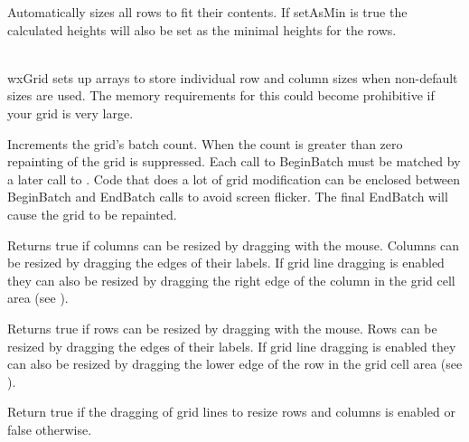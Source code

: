 Automatically sizes all rows to fit their contents. If setAsMin is true the calculated heights will
also be set as the minimal heights for the rows.

\\
wxGrid sets up arrays to store individual row and column sizes when non-default sizes are used.
The memory requirements for this could become prohibitive if your grid is very large. 

\label{wxgridbeginbatch}


Increments the grid's batch count. When the count is greater than zero repainting of
the grid is suppressed. Each call to BeginBatch must be matched by a later call to 
. Code that does a lot of grid
modification can be enclosed between BeginBatch and EndBatch calls to avoid
screen flicker. The final EndBatch will cause the grid to be repainted.

\label{wxgridcandragcolsize}


Returns true if columns can be resized by dragging with the mouse. Columns can be resized
by dragging the edges of their labels. If grid line dragging is enabled they can also be
resized by dragging the right edge of the column in the grid cell area 
(see ).

\label{wxgridcandragrowsize}


Returns true if rows can be resized by dragging with the mouse. Rows can be resized
by dragging the edges of their labels. If grid line dragging is enabled they can also be
resized by dragging the lower edge of the row in the grid cell area 
(see ).

\label{wxgridcandraggridsize}


Return true if the dragging of grid lines to resize rows and columns is enabled or false otherwise.

\label{wxgridcanenablecellcontrol}

